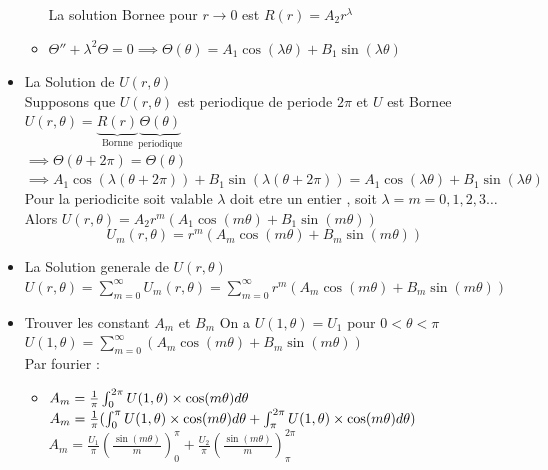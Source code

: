 \documentclass[12pt]{book}
\begin{document}
\begin{itemize}
\begin{itemize}
                        La solution Bornee pour $r\to 0$ est $ R(r)=A_2r^\lambda $
                    \item  $\Theta'' + \lambda^2\Theta =0 \implies \Theta(\theta) = A_1\cos(\lambda\theta) + B_1\sin(\lambda\theta)$
                   \end{itemize}
                \item La Solution de $ U(r,\theta) $ \\ 
                    Supposons que $ U(r,\theta) $ est periodique de periode $ 2\pi $ et $U$ est Bornee \\
                    $ U(r,\theta) = \underbrace{R(r)}_\text{Bornne}\underbrace{\Theta(\theta) }_\text{periodique}$ \\
                    $ \implies \Theta(\theta + 2\pi) = \Theta(\theta) $\\
                    $ \implies A_1\cos(\lambda(\theta+2\pi))+B_1\sin(\lambda(\theta+2\pi)) = A_1\cos(\lambda\theta)+B_1\sin(\lambda\theta) $ \\
                    Pour la periodicite soit valable $ \lambda  $ doit etre un entier , soit $ \lambda = m = 0,1,2,3\ldots $
                    Alors $ U(r,\theta) = A_2r^m(A_1\cos(m\theta) + B_1\sin(m\theta))  $
                    \[ U_m(r,\theta) = r^m(A_m\cos(m\theta)+B_m\sin(m\theta))\]
                \item La Solution generale de $ U(r,\theta) $ \\
                   $ U(r,\theta) = \sum^\infty_{m=0}U_m(r,\theta) = \sum^\infty_{m=0}r^m(A_m\cos(m\theta)+B_m\sin(m\theta)) $
                \item Trouver les constant $ A_m $ et $ B_m $
                   On a $ U(1,\theta)  = U_1  $ pour $  0<\theta<\pi $   \\
                   $ U(1,\theta) = \sum^\infty_{m=0}(A_m\cos(m\theta)+B_m\sin(m\theta)) $ \\
                   Par fourier :
                   \begin{itemize}
                    \item $A_m = \frac{1}{\pi}\int^{2\pi}_0U(1,\theta)\times\cos(m\theta)d\theta \\$
                          $A_m = \frac{1}{\pi}(\int^{\pi}_0U(1,\theta)\times\cos(m\theta)d\theta + \int^{2\pi}_\pi U(1,\theta)\times\cos(m\theta)d\theta )\\$
                          $A_m = \frac{U_1}{\pi}(\frac{\sin(m\theta)}{m})^\pi_0 + \frac{U_2}{\pi}(\frac{\sin(m\theta)}{m})_\pi^{2\pi} $\\

\end{itemize}
\end{itemize}
\end{document}
